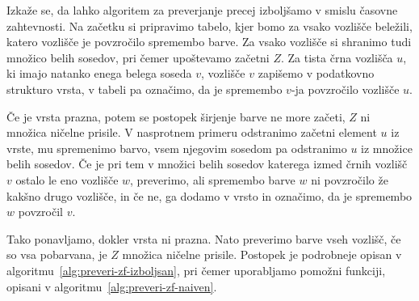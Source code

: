 \documentclass[12pt,a4paper,twoside]{article}
\theoremstyle{definition} %
\theoremstyle{plain} %
\numberwithin{equation}{section}  %
\begin{document}
Izkaže se, da lahko algoritem za preverjanje precej izboljšamo v smislu časovne zahtevnosti. Na začetku si pripravimo tabelo, kjer bomo za vsako vozlišče beležili, katero vozlišče je povzročilo spremembo barve. Za vsako vozlišče si shranimo tudi množico belih sosedov, pri čemer upoštevamo začetni $Z$. Za tista črna vozlišča $u$, ki imajo natanko enega belega soseda $v$, vozlišče $v$ zapišemo v podatkovno strukturo vrsta, v tabeli pa označimo, da je spremembo $v$-ja povzročilo vozlišče $u$. 

Če je vrsta prazna, potem se postopek širjenje barve ne more začeti, $Z$ ni množica ničelne prisile. V nasprotnem primeru odstranimo začetni element $u$ iz vrste, mu spremenimo barvo, vsem njegovim sosedom pa odstranimo $u$ iz množice belih sosedov. Če je pri tem v množici belih sosedov katerega izmed črnih vozlišč $v$ ostalo le eno vozlišče $w$, preverimo, ali spremembo barve $w$ ni povzročilo že kakšno drugo vozlišče, in če ne, ga dodamo v vrsto in označimo, da je spremembo $w$ povzročil $v$. 

Tako ponavljamo, dokler vrsta ni prazna. Nato preverimo barve vseh vozlišč, če so vsa pobarvana, je $Z$ množica ničelne prisile. Postopek je podrobneje opisan v algoritmu~\ref{alg:preveri-zf-izboljsan}, pri čemer uporabljamo pomožni funkciji, opisani v algoritmu~\ref{alg:preveri-zf-naiven}.
\end{document}
